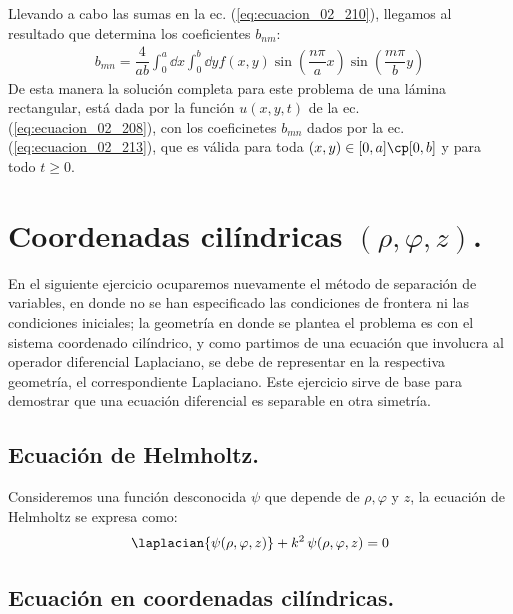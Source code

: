 Llevando a cabo las sumas en la ec. (\ref{eq:ecuacion_02_210}), llegamos al resultado que determina los coeficientes $b_{nm}$:
\begin{align}
b_{mn} = \dfrac{4}{ab} \int_{0}^{a} \dd{x} \int_{0}^{b} \dd{y} f(x, y) \sin \left( \dfrac{n \pi}{a} x \right) \sin \left( \dfrac{m \pi}{b} y \right)
\label{eq:ecuacion_02_213}
\end{align}
De esta manera la solución completa para este problema de una lámina rectangular, está dada por la función $u(x, y, t)$ de la ec. (\ref{eq:ecuacion_02_208}), con los coeficinetes $b_{mn}$ dados por la ec. (\ref{eq:ecuacion_02_213}), que es válida para toda $(x, y) \in [0, a] \cp [0, b]$ y para todo $t \geq 0$. 


\section{Coordenadas cilíndricas \texorpdfstring{$(\rho, \varphi, z)$}{(r, v, z)}.}

En el siguiente ejercicio ocuparemos nuevamente el método de separación de variables, en donde no se han especificado las condiciones de frontera ni las condiciones iniciales; la geometría en donde se plantea el problema es con el sistema coordenado cilíndrico, y como partimos de una ecuación que involucra al operador diferencial Laplaciano, se debe de representar en la respectiva geometría, el correspondiente Laplaciano. Este ejercicio sirve de base para demostrar que una ecuación diferencial es separable en otra simetría.

\subsection{Ecuación de Helmholtz.}

Consideremos una función desconocida $\psi$ que depende de $\rho, \varphi$ y $z$, la ecuación de Helmholtz se expresa como:
\begin{align}
\laplacian{\psi (\rho, \varphi, z)} + k^{2} \, \psi (\rho, \varphi, z) = 0
\label{eq:ecuacion_09_45}    
\end{align}

\subsection{Ecuación en coordenadas cilíndricas.}

